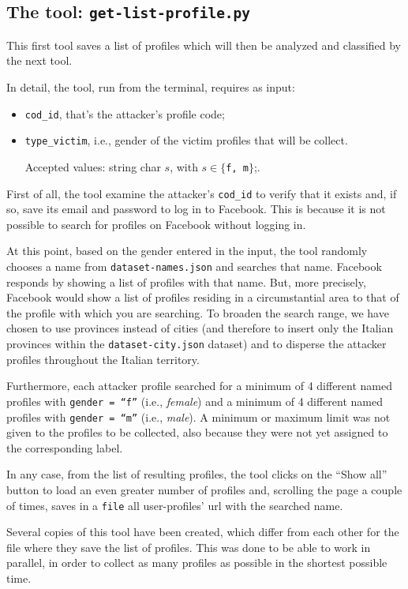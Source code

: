 \subsection{The tool: \texttt{get-list-profile.py}}
This first tool saves a list of profiles which will then be analyzed and classified by the next tool.\par \noindent In detail, the tool, run from the terminal, requires as input:
\begin{itemize}
	\item \texttt{cod\_id}, that's the attacker's profile code;
	\item \texttt{type\_victim}, i.e., gender of the victim profiles that will be collect.\par \noindent Accepted values: string char $s$, with $s \in \{$\texttt{f, m}$\}$;.
\end{itemize}
First of all, the tool examine the attacker's \texttt{cod\_id} to verify that it exists and, if so, save its email and password to log in to Facebook. This is because it is not possible to search for profiles on Facebook without logging in.
\par \noindent At this point, based on the gender entered in the input, the tool randomly chooses a name from \texttt{dataset-names.json} and searches that name. Facebook responds by showing a list of profiles with that name. But, more precisely, Facebook would show a list of profiles residing in a circumstantial area to that of the profile with which you are searching. To broaden the search range, we have chosen to use provinces instead of cities (and therefore to insert only the Italian provinces within the \texttt{dataset-city.json} dataset) and to disperse the attacker profiles throughout the Italian territory. 
\par \noindent Furthermore, each attacker profile searched for a minimum of 4 different named profiles with \texttt{gender = ``f''} (i.e., \textit{female}) and a minimum of 4 different named profiles with \texttt{gender = ``m''} (i.e., \textit{male}). A minimum or maximum limit was not given to the profiles to be collected, also because they were not yet assigned to the corresponding label.
\par \noindent In any case, from the list of resulting profiles, the tool clicks on the ``Show all'' button to load an even greater number of profiles and, scrolling the page a couple of times, saves in a \texttt{file} all user-profiles' url with the searched name.
\par \noindent Several copies of this tool have been created, which differ from each other for the file where they save the list of profiles. This was done to be able to work in parallel, in order to collect as many profiles as possible in the shortest possible time.

